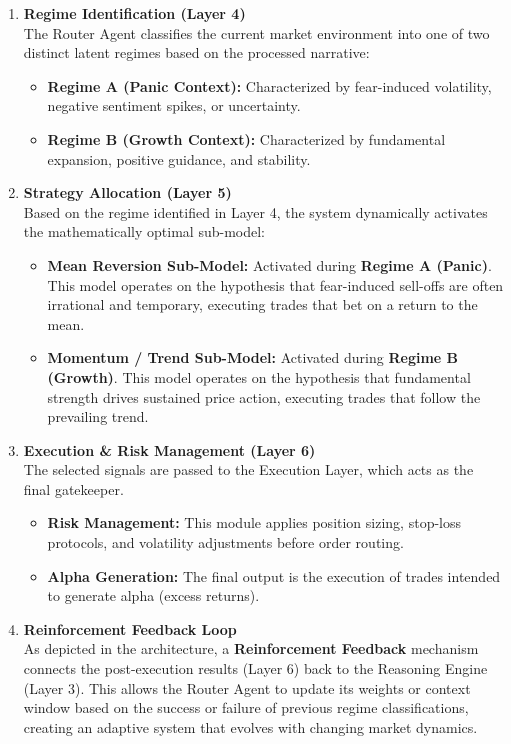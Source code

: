 \documentclass[12pt, a4paper]{report}
\begin{document}
\begin{enumerate}
    \item \textbf{Regime Identification (Layer 4)} \\
    The Router Agent classifies the current market environment into one of two distinct latent regimes based on the processed narrative:
    \begin{itemize}
        \item \textbf{Regime A (Panic Context):} Characterized by fear-induced volatility, negative sentiment spikes, or uncertainty.
        \item \textbf{Regime B (Growth Context):} Characterized by fundamental expansion, positive guidance, and stability.
    \end{itemize}

    \item \textbf{Strategy Allocation (Layer 5)} \\
    Based on the regime identified in Layer 4, the system dynamically activates the mathematically optimal sub-model:
    \begin{itemize}
        \item \textbf{Mean Reversion Sub-Model:} Activated during \textbf{Regime A (Panic)}. This model operates on the hypothesis that fear-induced sell-offs are often irrational and temporary, executing trades that bet on a return to the mean.
        \item \textbf{Momentum / Trend Sub-Model:} Activated during \textbf{Regime B (Growth)}. This model operates on the hypothesis that fundamental strength drives sustained price action, executing trades that follow the prevailing trend.
    \end{itemize}

    \item \textbf{Execution \& Risk Management (Layer 6)} \\
    The selected signals are passed to the Execution Layer, which acts as the final gatekeeper.
    \begin{itemize}
        \item \textbf{Risk Management:} This module applies position sizing, stop-loss protocols, and volatility adjustments before order routing.
        \item \textbf{Alpha Generation:} The final output is the execution of trades intended to generate alpha (excess returns).
    \end{itemize}

    \item \textbf{Reinforcement Feedback Loop} \\
    As depicted in the architecture, a \textbf{Reinforcement Feedback} mechanism connects the post-execution results (Layer 6) back to the Reasoning Engine (Layer 3). This allows the Router Agent to update its weights or context window based on the success or failure of previous regime classifications, creating an adaptive system that evolves with changing market dynamics.
\end{enumerate}
\end{document}
